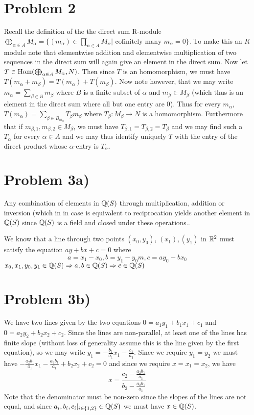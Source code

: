 \section*{Problem 2}
Recall the definition of the the direct sum R-module $\bigoplus_{\alpha\in A} M_\alpha = \{ (m_\alpha) \in \prod_{\alpha\in A} M_\alpha | \text{ cofinitely many } m_\alpha = 0 \}$. To make this an $R$ module note that elementwise addition and elementwise multiplication of two sequences in the direct sum will again give an element in the direct sum.  Now let $T\in \text{Hom}(\bigoplus_{\alpha\in A} M_\alpha, N)$. Then since $T$ is an homomorphism, we must have $T(m_\alpha+m_\beta)=T(m_\alpha) + T(m_\beta)$. Now note however, that we may write $m_\alpha = \sum_{\beta \in B} m_\beta$ where $B$ is a finite subset of $\alpha$ and $m_\beta \in M_\beta$ (which thus is an element in the direct sum where all but one entry are $0$).  Thus for every $m_\alpha$, $T(m_\alpha) = \sum_{\beta \in B_{m_\alpha}} T_\beta m_\beta$ where $T_\beta: M_\beta \to N$ is a homomorphism. Furthermore that if $m_{\beta,1}, m_{\beta,2} \in M_\beta$, we must have $T_{\beta,1}=T_{\beta,2}=T_{\beta}$ and we may find such a $T_\alpha$ for every $\alpha \in A$ and we may thus identify uniquely $T$ with the entry of the direct product whose $\alpha$-entry is $T_\alpha$. 
\section*{Problem 3a)}
\begin{obs}
Any combination of elements in $\mathbb{Q}(S)$ through multiplication, addition or inversion (which in in case is equivalent to reciprocation yields another element in $\mathbb{Q}(S)$ since $\mathbb{Q}(S)$ is a field and closed under these operations.. 
\end{obs}
We know that a line through two points $(x_0,y_0)$, $(x_1),(y_1)$ in $\mathbb{R}^2$ must satisfy the equation $ay+bx+c=0$ where 
\[ a=x_1-x_0, b=y_1-y_0m, c=ay_0-bx_0 \]
$x_0,x_1,y_0,y_1\in \mathbb{Q}(S)\Rightarrow a,b \in \mathbb{Q}(S)\Rightarrow c\in \mathbb{Q}(S)$
\section*{Problem 3b)}
We have two lines given by the two equations $0=a_1y_1+b_1x_1+c_1$ and $0=a_2 y_2+b_2 x_2+c_2$.  Since the lines are non-parallel, at least one of the lines has finite slope (without loss of generality assume this is the line given by the first equation), so we may write $y_1 = -\frac{b_1}{a_1} x_1 - \frac{c_1}{a_1}$. Since we require $y_1=y_2$ we must have 
 $-\frac{a_2 b_1}{a_1} x_1 - \frac{a_2 b_1}{a_1}  + b_2 x_2 + c_2 = 0$ and since we require $x=x_1=x_2$, we have
 \[ x = \dfrac{c_2 - \frac{a_2 b_1}{a_1}}{b_2 - \frac{a_2 b_1}{a_1}} \]
 Note that the denominator must be non-zero since the slopes of the lines are not equal, and since $a_i,b_i,c_i|_{i\in\{1,2\}} \in \mathbb{Q}(S)$ we must have $x\in \mathbb{Q}(S)$. 
